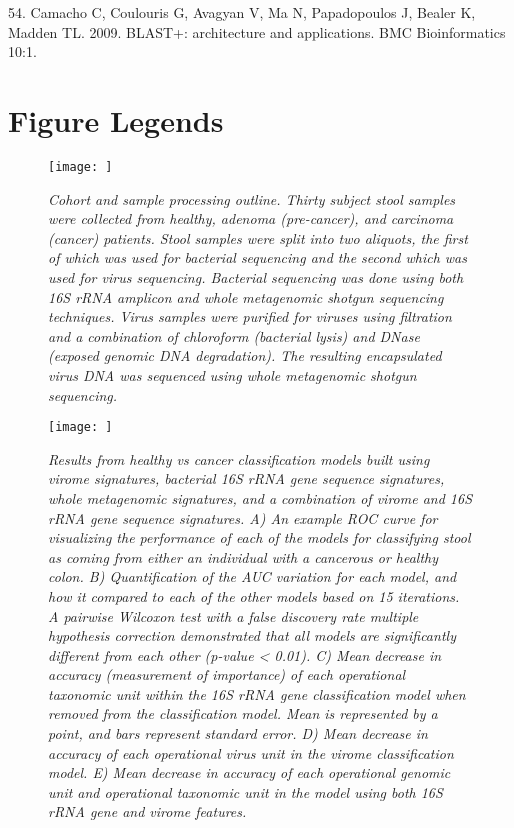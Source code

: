 \documentclass[12pt,]{article}
\begin{document}
\hypertarget{ref-Camacho:2009fc}{}
54. Camacho C, Coulouris G, Avagyan V, Ma N, Papadopoulos J, Bealer K,
Madden TL. 2009. BLAST+: architecture and applications. BMC
Bioinformatics 10:1.

\newpage

\section{Figure Legends}\label{figure-legends}

\begin{figure}[htbp]
\centering
\texttt{[image: ]}
\caption{\emph{Cohort and sample processing outline. Thirty subject
stool samples were collected from healthy, adenoma (pre-cancer), and
carcinoma (cancer) patients. Stool samples were split into two aliquots,
the first of which was used for bacterial sequencing and the second
which was used for virus sequencing. Bacterial sequencing was done using
both 16S rRNA amplicon and whole metagenomic shotgun sequencing
techniques. Virus samples were purified for viruses using filtration and
a combination of chloroform (bacterial lysis) and DNase (exposed genomic
DNA degradation). The resulting encapsulated virus DNA was sequenced
using whole metagenomic shotgun sequencing.} \label{sampleproc}}
\end{figure}

\newpage

\begin{figure}[htbp]
\centering
\texttt{[image: ]}
\caption{\emph{Results from healthy vs cancer classification models
built using virome signatures, bacterial 16S rRNA gene sequence
signatures, whole metagenomic signatures, and a combination of virome
and 16S rRNA gene sequence signatures. A) An example ROC curve for
visualizing the performance of each of the models for classifying stool
as coming from either an individual with a cancerous or healthy colon.
B) Quantification of the AUC variation for each model, and how it
compared to each of the other models based on 15 iterations. A pairwise
Wilcoxon test with a false discovery rate multiple hypothesis correction
demonstrated that all models are significantly different from each other
(p-value \textless{} 0.01). C) Mean decrease in accuracy (measurement of
importance) of each operational taxonomic unit within the 16S rRNA gene
classification model when removed from the classification model. Mean is
represented by a point, and bars represent standard error. D) Mean
decrease in accuracy of each operational virus unit in the virome
classification model. E) Mean decrease in accuracy of each operational
genomic unit and operational taxonomic unit in the model using both 16S
rRNA gene and virome features.}\label{predmodel}}
\end{figure}
\end{document}
